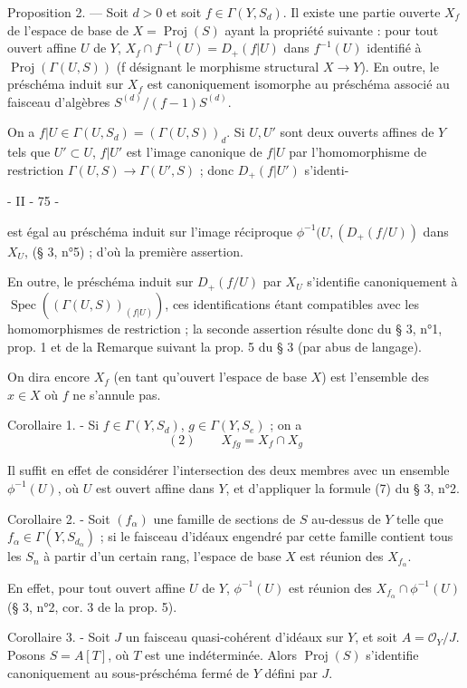 Proposition 2. — Soit $d > 0$ et soit $f \in \Gamma(Y, S_d)$. Il existe une partie ouverte $X_f$ de l'espace de base de $X = \operatorname{Proj}(S)$ ayant la propriété suivante : pour tout ouvert affine $U$ de $Y$, $X_f \cap f^{-1}(U) = D_+(f|U)$ dans $f^{-1}(U)$ identifié à $\operatorname{Proj}(\Gamma(U, S))$ (f désignant le morphisme structural $X \to Y$). En outre, le préschéma induit sur $X_f$ est canoniquement isomorphe au préschéma associé au faisceau d'algèbres $S^{(d)} / (f-1)S^{(d)}$.

On a $f|U \in \Gamma(U, S_d) = (\Gamma(U, S))_d$. Si $U, U'$ sont deux ouverts affines de $Y$ tels que $U' \subset U$, $f|U'$ est l'image canonique de $f|U$ par l'homomorphisme de restriction $\Gamma(U, S) \to \Gamma(U', S)$ ; donc $D_+(f|U')$ s'identi-

\newpage


- II - 75 -

est égal au préschéma induit sur l'image réciproque $\phi^{-1}(U, (D_+(f/U))$ dans $X_U$, (§ 3, n°5) ; d'où la première assertion.

En outre, le préschéma induit sur $D_+(f/U)$ par $X_U$ s'identifie canoniquement à $\operatorname{Spec}((\Gamma(U, S))_{(f|U)})$, ces identifications étant compatibles avec les homomorphismes de restriction ; la seconde assertion résulte donc du § 3, n°1, prop. 1 et de la Remarque suivant la prop. 5 du § 3 (par abus de langage).

On dira encore $X_f$ (en tant qu'ouvert l'espace de base $X$) est l'ensemble des $x \in X$ où $f$ ne s'annule pas.

Corollaire 1. - Si $f \in \Gamma(Y, S_d)$, $g \in \Gamma(Y, S_e)$ ; on a
$$(2) \qquad X_{fg} = X_f \cap X_g$$

Il suffit en effet de considérer l'intersection des deux membres avec un ensemble $\phi^{-1}(U)$, où $U$ est ouvert affine dans $Y$, et d'appliquer la formule (7) du § 3, n°2.

Corollaire 2. - Soit $(f_\alpha)$ une famille de sections de $S$ au-dessus de $Y$ telle que $f_\alpha \in \Gamma(Y, S_{d_\alpha})$ ; si le faisceau d'idéaux engendré par cette famille contient tous les $S_n$ à partir d'un certain rang, l'espace de base $X$ est réunion des $X_{f_\alpha}$.

En effet, pour tout ouvert affine $U$ de $Y$, $\phi^{-1}(U)$ est réunion des $X_{f_\alpha} \cap \phi^{-1}(U)$ (§ 3, n°2, cor. 3 de la prop. 5).

Corollaire 3. - Soit $J$ un faisceau quasi-cohérent d'idéaux sur $Y$, et soit $A = \mathcal{O}_Y / J$. Posons $S = A[T]$, où $T$ est une indéterminée. Alors $\operatorname{Proj}(S)$ s'identifie canoniquement au sous-préschéma fermé de $Y$ défini par $J$.

